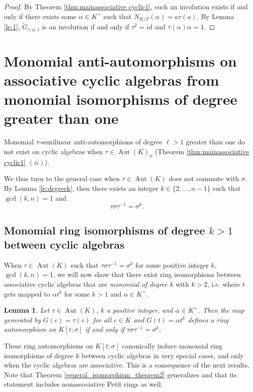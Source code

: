 \documentclass{amsart}
\theoremstyle{plain}
\newtheorem{lemma}[theorem]{Lemma}
\theoremstyle{definition}
\numberwithin{equation}{section}
\numberwithin{figure}{section}
\DeclareMathOperator{\Aut}{Aut}
\begin{document}
\begin{proof}
By Theorem \ref{thm:mainassociative cyclic1}, such an involution exists if and only if there exists  some $\alpha\in K^\times$ such that
$N_{K/F}( \alpha)= a\tau(a).$ By Lemma \ref{le:1}, $\widetilde G_{\tau,\alpha,1}$ is an involution if and only if $\tau^2=id$ and
 $ \tau(\alpha)\alpha=1.$
\end{proof}



\section{Monomial anti-automorphisms on associative cyclic algebras from monomial isomorphisms of degree  greater than one}


Monomial $\tau$-semilinear anti-automorphisms of degree $\ell>1$ greater than one do not exist on cyclic algebras when
$\tau\in \Aut(K)_\sigma$ (Theorem \ref{thm:mainassociative cyclic1} $(ii)$).

We thus turn to the general case when $\tau\in \Aut(K)$ does not commute with $\sigma$. By Lemma \ref{le:degreek}, then there exists an integer $k\in \{2,\dots, n-1 \}$ such that $\gcd (k, n)=1$ and
$$\tau \sigma\tau^{-1}=\sigma^k.$$


 \subsection{Monomial ring isomorphisms of degree $k>1$ between cyclic algebras}\label{sec:isocyclic}

  When $\tau\in \Aut(K)$ such that $\tau \sigma\tau^{-1}=\sigma^k$ for some positive integer $k$,  $\gcd (k, n)=1$, we will now show that there exist ring isomorphisms between associative cyclic algebras that are  \emph{monomial of degree $k$} with $k>2$, i.e. where $t$ gets mapped to $\alpha t^k$ for some $k>1$ and $\alpha\in K^\times$.

 \begin{lemma}\label{L:Ktsigmatoitself}\cite[Lemma 3.1]{NevPum2025}
    Let $\tau\in \Aut(K)$, $k$ a positive integer,  and $\alpha\in K^\times$.  Then the map generated by $G(c)=\tau(c)$ for all $c\in K$ and $G(t)=\alpha t^k$ defines a ring automorphism  on $K[t;\sigma]$ if and only if $\tau\sigma\tau^{-1}=\sigma^k$.
\end{lemma}

 These ring automorphisms on $K[t;\sigma]$  canonically induce monomial ring isomorphisms of degree $k$ between cyclic algebras in very special cases, and only when the cyclic algebras are associative. This is a consequence of the next results. Note that Theorem \ref{general_isomorphism_theorem2} generalizes \cite[Theorem 4.4]{NevPum2025} and that its statement includes nonassociative Petit rings as well.
\end{document}

